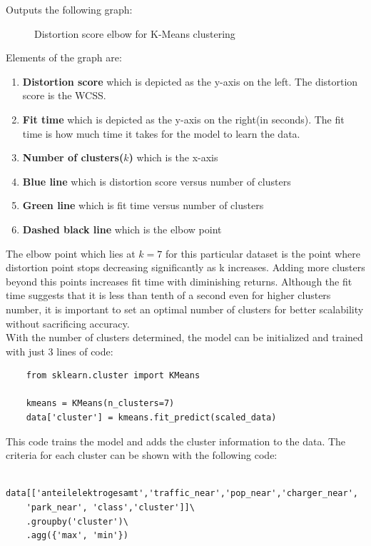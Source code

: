 Outputs the following graph:
\begin{figure}[H]
\begin{center}

\caption{ Distortion score elbow for K-Means clustering }
\end{center}
\end{figure}
Elements of the graph are:
\begin{enumerate}
    \item \textbf{Distortion score} which is depicted as the y-axis on the left. The distortion score is the WCSS.
    \item \textbf{Fit time} which is depicted as the y-axis on the right(in seconds). The fit time is how much time it takes for the model to learn the data.
    \item \textbf{Number of clusters($k$)} which is the x-axis
    \item \textbf{Blue line} which is distortion score versus number of clusters
    \item \textbf{Green line} which is fit time versus number of clusters
    \item \textbf{Dashed black line} which is the elbow point
\end{enumerate}
The elbow point which lies at $k=7$ for this particular dataset is the point where distortion point stops decreasing significantly as k increases. Adding more clusters beyond this points increases fit time with diminishing returns. Although the fit time suggests that it is less than tenth of a second even for higher clusters number, it is important to set an optimal number of clusters for better scalability without sacrificing accuracy.\\
With the number of clusters determined, the model can be initialized and trained with just 3 lines of code:
\begin{verbatim}
    from sklearn.cluster import KMeans
    
    kmeans = KMeans(n_clusters=7)
    data['cluster'] = kmeans.fit_predict(scaled_data)
\end{verbatim}
This code trains the model and adds the cluster information to the data. The criteria for each cluster can be shown with the following code:
\begin{verbatim}
    data[['anteilelektrogesamt','traffic_near','pop_near','charger_near', 
    'park_near', 'class','cluster']]\
    .groupby('cluster')\
    .agg({'max', 'min'})
\end{verbatim}
